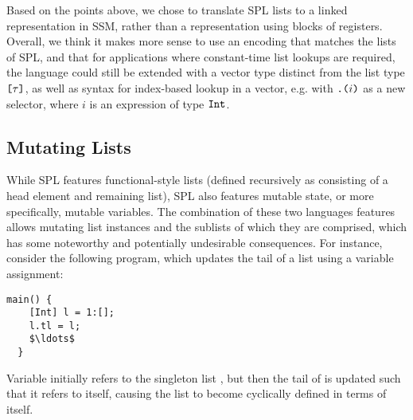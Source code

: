 Based on the points above, we chose to translate SPL lists to a linked
representation in SSM, rather than a representation using blocks of registers.
Overall, we think it makes more sense to use an encoding that matches the lists
of SPL, and that for applications where constant-time list lookups are required,
the language could still be extended with a vector type distinct from the list
type $\texttt{[}\tau\texttt{]}$, as well as syntax for index-based lookup in a vector, e.g.
with $\texttt{.(}i\texttt{)}$ as a new selector, where $i$ is an expression of type
$\texttt{Int}$.


\subsection{Mutating Lists}
While SPL features functional-style lists (defined recursively as consisting of
a head element and remaining list), SPL also features mutable state, or more
specifically, mutable variables.
The combination of these two languages features allows mutating list instances
and the sublists of which they are comprised, which has some noteworthy and
potentially undesirable consequences.
For instance, consider the following program, which updates the tail of a list
using a variable assignment:
%
\begin{lstlisting}[language=spl]
  main() {
    [Int] l = 1:[];
    l.tl = l;
    $\ldots$
  }
\end{lstlisting}

Variable  initially refers to the singleton list , but then the
tail of  is updated such that it refers to  itself, causing the
list to become cyclically defined in terms of itself.

